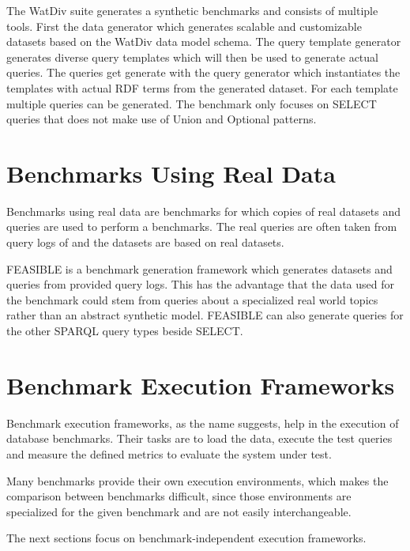 The WatDiv suite generates a synthetic benchmarks and consists of multiple tools\cite{alucDiversifiedStressTesting2014}.
First the data generator which generates scalable and customizable datasets based on the WatDiv data model schema.
The query template generator generates diverse query templates which will then be used to generate actual queries.
The queries get generate with the query generator which instantiates the templates with actual RDF terms from the generated dataset.
For each template multiple queries can be generated.
The benchmark only focuses on SELECT queries that does not make use of Union and Optional patterns.

\section{Benchmarks Using Real Data}
\label{sec:benchmarks_real_data}
Benchmarks using real data are benchmarks for which copies of real datasets and queries are used to perform a benchmarks.
The real queries are often taken from query logs of \tsp{} and the datasets are based on real datasets\cite{morseyDBpediaSPARQLBenchmark2011, saleemFEASIBLEFeatureBasedSPARQL2015}.

FEASIBLE is a benchmark generation framework which generates datasets and queries from provided query logs\cite{saleemFEASIBLEFeatureBasedSPARQL2015}.
This has the advantage that the data used for the benchmark could stem from queries about a specialized real world topics rather than an abstract synthetic model.
FEASIBLE can also generate queries for the other SPARQL query types beside SELECT.

\section{Benchmark Execution Frameworks}
\label{sec:benchmark_frameworks}
Benchmark execution frameworks, as the name suggests, help in the execution of database benchmarks.
Their tasks are to load the data, execute the test queries and measure the defined metrics to evaluate the system under test.

Many benchmarks provide their own execution environments, which makes the comparison between benchmarks difficult, since those environments are specialized for the given benchmark and are not easily interchangeable\cite{conradsIguanaGenericFramework2017}.

The next sections focus on benchmark-independent execution frameworks.


